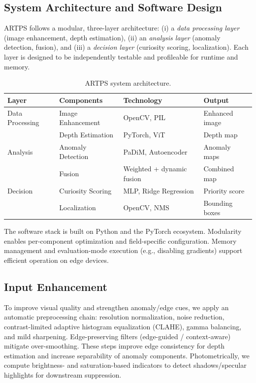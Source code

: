 \documentclass[12pt]{article}
\begin{document}
\subsection{System Architecture and Software Design}
ARTPS follows a modular, three-layer architecture: (i) a \emph{data processing layer} (image enhancement, depth estimation), (ii) an \emph{analysis layer} (anomaly detection, fusion), and (iii) a \emph{decision layer} (curiosity scoring, localization). Each layer is designed to be independently testable and profileable for runtime and memory.

\begin{table}[t]
\centering
\renewcommand{\arraystretch}{1.15}
\begin{tabular}{llll}
\toprule
\rowcolor{tblHeader}
\textbf{Layer} & \textbf{Components} & \textbf{Technology} & \textbf{Output} \\
\midrule
Data Processing & Image Enhancement & OpenCV, PIL & Enhanced image \\
 & Depth Estimation & PyTorch, ViT & Depth map \\
Analysis & Anomaly Detection & PaDiM, Autoencoder & Anomaly maps \\
 & Fusion & Weighted + dynamic fusion & Combined map \\
Decision & Curiosity Scoring & MLP, Ridge Regression & Priority score \\
 & Localization & OpenCV, NMS & Bounding boxes \\
\bottomrule
\end{tabular}
\caption{ARTPS system architecture.}
\end{table}

The software stack is built on Python and the PyTorch ecosystem. Modularity enables per-component optimization and field-specific configuration. Memory management and evaluation-mode execution (e.g., disabling gradients) support efficient operation on edge devices.



\subsection{Input Enhancement}
To improve visual quality and strengthen anomaly/edge cues, we apply an automatic preprocessing chain: resolution normalization, noise reduction, contrast-limited adaptive histogram equalization (CLAHE), gamma balancing, and mild sharpening. Edge-preserving filters (edge-guided / context-aware) mitigate over-smoothing. These steps improve edge consistency for depth estimation and increase separability of anomaly components. Photometrically, we compute brightness- and saturation-based indicators to detect shadows/specular highlights for downstream suppression.
\end{document}
